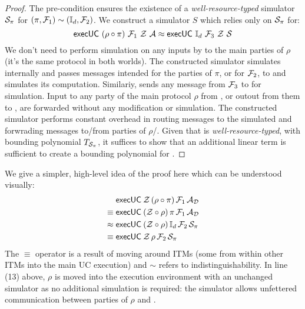\begin{proof}
The pre-condition ensures the existence of a \textit{well-resource-typed} simulator $\mathcal{S}_\pi$ for $(\pi, \mathcal{F}_1) \sim (\mathbb{I}_d, \mathcal{F}_2)$. 
We construct a simulator $S$ which relies only on $\mathcal{S}_\pi$ for:
\[
	{\mathsf {execUC}}\ (\rho \circ \pi)\ \mathcal{F}_1\ \mathcal{Z}\ \mathcal{A} \approx {\mathsf {execUC}}\ \mathbb{I}_d\ \mathcal{F}_3\ \mathcal{Z}\ \mathcal{S}
\]	
We don't need to perform simulation on any inputs by \Environment to the main parties of $\rho$ (it's the same protocol in both worlds).
The constructed simulator \Simulator simulates \Sim{\pi} internally and passes messages intended for the parties of $\pi$, or for $\mathcal{F}_2$, to \Sim{\pi} and simulates its computation.
Similariy, \Simulator sends any message from $\mathcal{F}_3$ to \Sim{\pi} for simulation.  
Input to any party of the main protocol $\rho$ from \Environment, or outout from them to \Simulator, are forwarded without any modification or simulation.
The constructed simulator performs constant overhead in routing messages to the simulated \Sim{\pi} and forwrading messages to/from parties of $\rho$/\Environment. 
Given that \Sim{\pi} is \textit{well-resource-typed}, with bounding polynomial $T_{\mathcal{S}_{\pi}}$, it suffices to show that an additional linear term is sufficient to create a bounding polynomial for \Simulator.

\end{proof}

We give a simpler, high-level idea of the proof here which can be understood visually:
\begin{align}
& {\mathsf {execUC}} \: \mathcal{Z} \, (\rho \circ \pi) \, \mathcal{F}_1 \, \mathcal{A}_\mathcal{D} \\
\equiv \; & {\mathsf {execUC}} \: (\mathcal{Z} \circ \rho) \, \pi \, \mathcal{F}_1 \, \mathcal{A}_\mathcal{D} \\
\approx \; & {\mathsf {execUC}} \: (\mathcal{Z} \circ \rho) \, \mathbb{I}_d \, \mathcal{F}_2 \, \mathcal{S}_{\pi} \\
\equiv \; & {\mathsf {execUC}} \: \mathcal{Z} \, \rho \, \mathcal{F}_2 \, \mathcal{S}_{\pi} 
\end{align}
The $\equiv$ operator is a result of moving around ITMs (some from within other ITMs into the main UC execution) and $\sim$ refers to indistinguishability.
In line (13) above, $\rho$ is moved into the execution environment with an unchanged simulator as no additional simulation is required: the simulator allows unfettered communication between parties of $\rho$ and \Environment.

